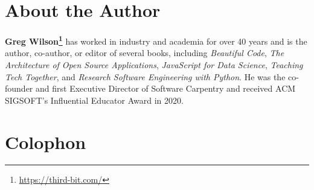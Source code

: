 \documentclass[krantzl]{krantz}
\newcommand{\hreffoot}[2]{{#1}\footnote{\href{#2}{#2}}}
\begin{document}
\chapter{About the Author}\label{author}




\textbf{\hreffoot{Greg Wilson}{https://third-bit.com/}} has worked in industry and academia for over 40 years
and is the author, co-author, or editor of several books,
including \emph{Beautiful Code},
\emph{The Architecture of Open Source Applications},
\emph{JavaScript for Data Science},
\emph{Teaching Tech Together},
and \emph{Research Software Engineering with Python}.
He was the co-founder and first Executive Director of Software Carpentry
and received ACM SIGSOFT’s Influential Educator Award in 2020.

\chapter{Colophon}\label{colophon}
\end{document}
